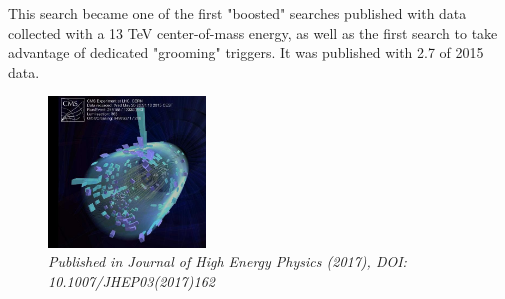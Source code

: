 \begin{singlespace}
\begin{centering}
{\newline
\newline
This search became one of the first "boosted" searches published with data collected with a 13 TeV center-of-mass energy, as well as the first search to take advantage of dedicated "grooming" triggers. It was published with 2.7 \fbinv of 2015 data.
}
\begin{figure}[b!] 
    \centering
    \includegraphics[height=4cm]{figures/analysis/search1/misc/first_coll.png}
    \vspace*{10mm}
    \caption*{\footnotesize{\textit{Published in Journal of High Energy Physics (2017), DOI: 10.1007/JHEP03(2017)162}}}
\end{figure}
\end{centering}
\end{singlespace}
\clearpage

\clearpage


